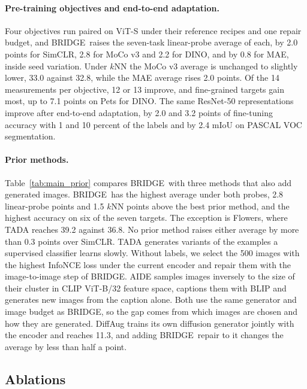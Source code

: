 \documentclass{article}
\newcommand{\method}{BRIDGE}
\begin{document}

\paragraph{Pre-training objectives and end-to-end adaptation.} Four objectives run paired on ViT-S under their reference recipes and one repair budget, and \method\ raises the seven-task linear-probe average of each, by 2.0 points for SimCLR, 2.8 for MoCo v3 and 2.2 for DINO, and by 0.8 for MAE, inside seed variation. Under $k$NN the MoCo v3 average is unchanged to slightly lower, 33.0 against 32.8, while the MAE average rises 2.0 points. Of the 14 measurements per objective, 12 or 13 improve, and fine-grained targets gain most, up to 7.1 points on Pets for DINO. The same ResNet-50 representations improve after end-to-end adaptation, by 2.0 and 3.2 points of fine-tuning accuracy with 1 and 10 percent of the labels and by 2.4 mIoU on PASCAL VOC segmentation.


\paragraph{Prior methods.} Table~\ref{tab:main_prior} compares \method\ with three methods that also add generated images. \method\ has the highest average under both probes, 2.8 linear-probe points and 1.5 $k$NN points above the best prior method, and the highest accuracy on six of the seven targets. The exception is Flowers, where TADA reaches 39.2 against 36.8. No prior method raises either average by more than 0.3 points over SimCLR. TADA generates variants of the examples a supervised classifier learns slowly. Without labels, we select the 500 images with the highest InfoNCE loss under the current encoder and repair them with the image-to-image step of \method. AIDE samples images inversely to the size of their cluster in CLIP ViT-B/32 feature space, captions them with BLIP and generates new images from the caption alone. Both use the same generator and image budget as \method, so the gap comes from which images are chosen and how they are generated. DiffAug trains its own diffusion generator jointly with the encoder and reaches 11.3, and adding \method\ repair to it changes the average by less than half a point.

\subsection{Ablations}
\label{sec:ablations}


\end{document}
